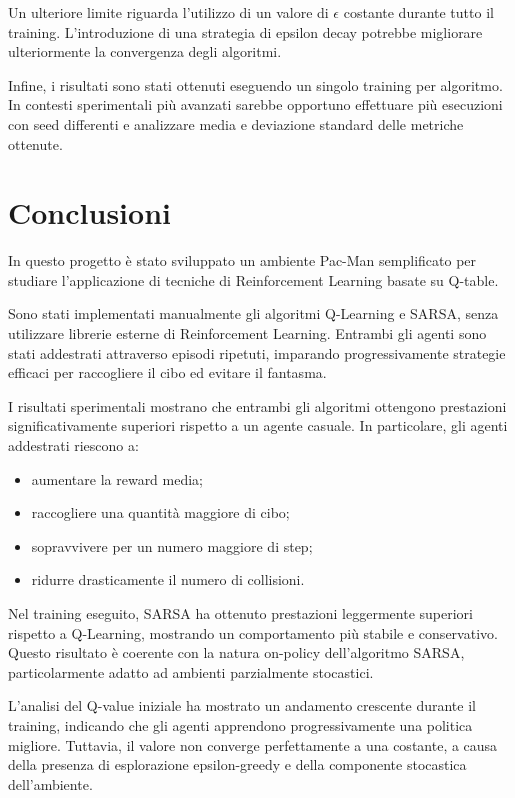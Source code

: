 \documentclass[12pt,a4paper]{report}
\begin{document}
Un ulteriore limite riguarda l’utilizzo di un valore di $\epsilon$ costante durante tutto il training. L’introduzione di una strategia di epsilon decay potrebbe migliorare ulteriormente la convergenza degli algoritmi.

Infine, i risultati sono stati ottenuti eseguendo un singolo training per algoritmo. In contesti sperimentali più avanzati sarebbe opportuno effettuare più esecuzioni con seed differenti e analizzare media e deviazione standard delle metriche ottenute.


\chapter{Conclusioni}

In questo progetto è stato sviluppato un ambiente Pac-Man semplificato per studiare l’applicazione di tecniche di Reinforcement Learning basate su Q-table.

Sono stati implementati manualmente gli algoritmi Q-Learning e SARSA, senza utilizzare librerie esterne di Reinforcement Learning. Entrambi gli agenti sono stati addestrati attraverso episodi ripetuti, imparando progressivamente strategie efficaci per raccogliere il cibo ed evitare il fantasma.

I risultati sperimentali mostrano che entrambi gli algoritmi ottengono prestazioni significativamente superiori rispetto a un agente casuale. In particolare, gli agenti addestrati riescono a:
\begin{itemize}
    \item aumentare la reward media;
    \item raccogliere una quantità maggiore di cibo;
    \item sopravvivere per un numero maggiore di step;
    \item ridurre drasticamente il numero di collisioni.
\end{itemize}

Nel training eseguito, SARSA ha ottenuto prestazioni leggermente superiori rispetto a Q-Learning, mostrando un comportamento più stabile e conservativo. Questo risultato è coerente con la natura on-policy dell’algoritmo SARSA, particolarmente adatto ad ambienti parzialmente stocastici.

L’analisi del Q-value iniziale ha mostrato un andamento crescente durante il training, indicando che gli agenti apprendono progressivamente una politica migliore. Tuttavia, il valore non converge perfettamente a una costante, a causa della presenza di esplorazione epsilon-greedy e della componente stocastica dell’ambiente.
\end{document}
